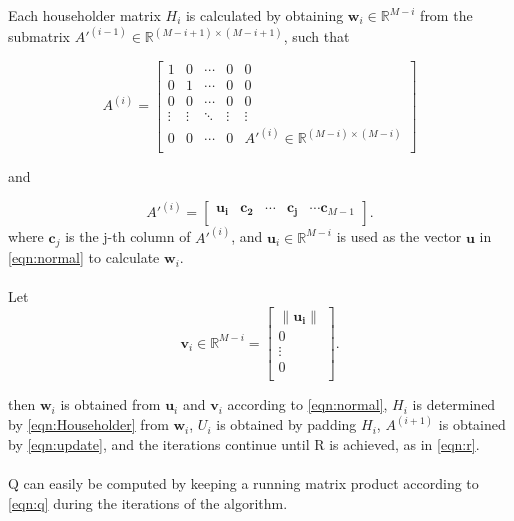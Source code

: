 \documentclass{article}
\begin{document}
Each householder matrix $H_{i}$ is calculated by obtaining $\mathbf{w}_i\in\mathbb{R}^{M-i}$ from the submatrix $A'^{(i-1)}\in\mathbb{R}^{(M-i+1)\times{}(M-i+1)}$, such that

\begin{equation}
A^{(i)} =
\begin{bmatrix}
1 & 0 & \cdots & 0  & 0\\
0 & 1  & \cdots & 0 & 0\\
0 & 0 & \cdots & 0 & 0\\
\vdots & \vdots  & \ddots & \vdots & \vdots\\
0 & 0  & \cdots & 0 & A'^{(i)}\in\mathbb{R}^{(M-i)\times{}(M-i)}\\
\end{bmatrix}
\end{equation}

and

\begin{equation}
A'^{(i)} =
\begin{bmatrix}
\mathbf{u_i} & \mathbf{c_2}  & \cdots & \mathbf{c_j} & \cdots \mathbf{c}_{M-1}\\
\end{bmatrix}.
\end{equation}
where $\mathbf{c}_j$ is the j-th column of $A'^{(i)}$, and $\mathbf{u}_i\in\mathbb{R}^{M-i}$ is used as the vector $\mathbf{u}$ in \eqref{eqn:normal} to calculate $\mathbf{w}_{i}$.
\paragraph{}
Let
\begin{equation}
\mathbf{v}_i\in\mathbb{R}^{M-i} = 
\begin{bmatrix}
\|\mathbf{u_i}\| \\
0  \\
\vdots \\
0 \\
\end{bmatrix}.
\end{equation}

then $\mathbf{w}_i$ is obtained from $\mathbf{u}_i$ and $\mathbf{v}_i$ according to \eqref{eqn:normal}, $H_i$ is determined by \eqref{eqn:Householder} from $\mathbf{w}_i$, $U_i$ is obtained by padding $H_i$, $A^{(i+1)}$ is obtained by \eqref{eqn:update}, and the iterations continue until R is achieved, as in \eqref{eqn:r}.

\paragraph{}
Q can easily be computed by keeping a running matrix product according to \eqref{eqn:q} during the iterations of the algorithm.
\end{document}
